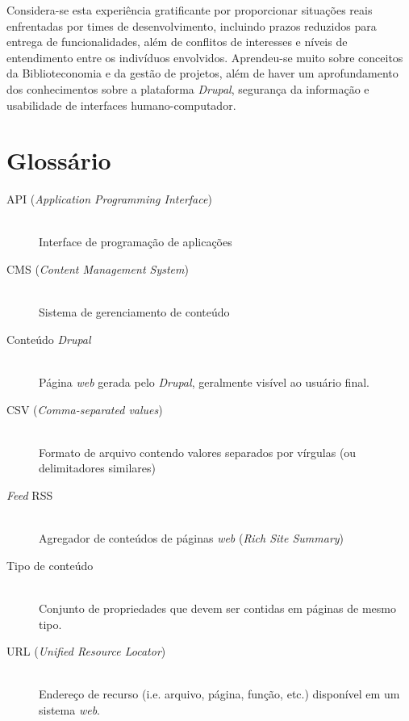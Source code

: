 \documentclass[a4paper]{article}
\begin{document}
Considera-se esta experiência gratificante por proporcionar situações reais enfrentadas por times de desenvolvimento, incluindo prazos reduzidos para entrega de funcionalidades, além de conflitos de interesses e níveis de entendimento entre os indivíduos envolvidos. Aprendeu-se muito sobre conceitos da Biblioteconomia e da gestão de projetos, além de haver um aprofundamento dos conhecimentos sobre a plataforma \textit{Drupal}, segurança da informação e usabilidade de interfaces humano-computador.

\pagebreak
\section*{Glossário}
\begin{description}
\item[API (\textit{Application Programming Interface})] \hfill \\ Interface de programação de aplicações
\item[CMS (\textit{Content Management System})] \hfill \\ Sistema de gerenciamento de conteúdo
\item[Conteúdo \textit{Drupal}] \hfill \\ Página \textit{web} gerada pelo \textit{Drupal}, geralmente visível ao usuário final.
\item[CSV (\textit{Comma-separated values})] \hfill \\ Formato de arquivo contendo valores separados por vírgulas (ou delimitadores similares)
\item[\textit{Feed} RSS] \hfill \\ Agregador de conteúdos de páginas \textit{web} (\textit{Rich Site Summary})
\item[Tipo de conteúdo] \hfill \\ Conjunto de propriedades que devem ser contidas em páginas de mesmo tipo.
\item[URL (\textit{Unified Resource Locator})] \hfill \\ Endereço de recurso (i.e. arquivo, página, função, etc.) disponível em um sistema \textit{web}.
\end{description}
\end{document}
